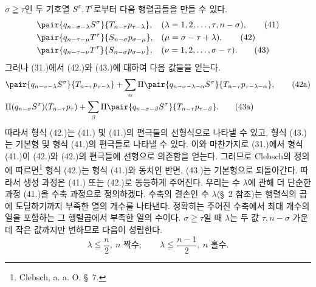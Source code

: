 
$\sigma\geqq\tau$인 두 기호열 $S^\sigma,T^\tau$로부터 다음 행렬곱들을 만들 수 있다.
\begin{align}
&\pair{q_{n-\sigma-\lambda}S^\sigma}{T_{n-\tau}p_{\tau-\lambda}}, &&(\lambda=1,2,\ldots,\tau,n-\sigma),\tag{41}\\
&\pair{q_{n-\tau-\mu}T^\tau}{S_{n-\sigma}p_{\sigma-\mu}}, &&(\mu=\sigma-\tau+\lambda),\tag{42}\\
&\pair{q_{n-\tau-\nu}T^\tau}{S_{n-\sigma}p_{\sigma-\nu}}, &&(\nu=1,2,\ldots,\sigma-\tau).
\tag{43}
\end{align}
그러나 (31.)에서 (42.)와 (43.)에 대하여 다음 값들을 얻는다.
\begin{align}
&\pair{q_{n-\sigma-\lambda}S^\sigma}{T_{n-\tau}p_{\tau-\lambda}}
 +\sum_{\alpha}\Pi\pair{q_{n-\sigma-\lambda-\alpha}S^\sigma}{T_{n-\tau}p_{\tau-\lambda-\alpha}},\tag{42a}\\
&\Pi(q_{n-\sigma}S^\sigma)(T_{n-\tau}p_\tau)
 +\sum_{\beta}\Pi\pair{q_{n-\sigma-\beta}S^\sigma}{T_{n-\tau}p_{\tau-\beta}}.
\tag{43a}
\end{align}
따라서 형식 (42.)는 (41.) 및 (41.)의 편극들의 선형식으로 나타낼 수 있고, 형식 (43.)는 기본형 및 형식 (41.)의 편극들로 나타낼 수 있다. 이와 마찬가지로 (31.)에서 형식 (41.)이 (42.)와 (42.)의 편극들에 선형으로 의존함을 얻는다. 그러므로 Clebsch의 정의에 따르면\footnote{Clebsch, a. a. O. \S\ 7.} 형식 (42.)는 형식 (41.)와 동치인 반면, (43.)는 기본형으로 되돌아간다. 따라서 생성 과정은 (41.) 또는 (42.)로 동등하게 주어진다. 우리는 수 $\lambda$에 관해 더 단순한 과정 (41.)을 수축 과정으로 정의하겠다. 수축의 결손인 수 $\lambda$(\S\ 2 참조)는 행렬식의 곱에 도달하기까지 부족한 열의 개수를 나타낸다. 정확히는 주어진 수축에서 최대 개수의 열을 포함하는 그 행렬곱에서 부족한 열의 수이다. $\sigma\geqq\tau$일 때 $\lambda$는 두 값 $\tau,n-\sigma$ 가운데 작은 값까지만 변하므로 다음이 성립한다.
\begin{equation}
 \lambda\leqq\frac n2,\ n\text{ 짝수};\qquad
 \lambda\leqq\frac{n-1}{2},\ n\text{ 홀수}.
\tag{44}
\end{equation}
